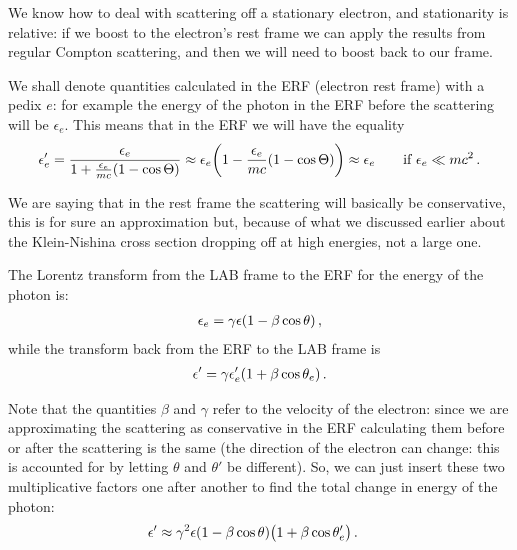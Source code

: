 \documentclass[main.tex]{subfiles}
\begin{document}
We know how to deal with scattering off a stationary electron, and stationarity is relative: if we boost to the electron's rest frame we can apply the results from regular Compton scattering, and then we will need to boost back to our frame. 

We shall denote quantities calculated in the ERF (electron rest frame) with a pedix \(e\): for example the energy of the photon in the ERF before the scattering will be \(\epsilon_e\).
This means that in the ERF we will have the equality 
%
\begin{align}
\epsilon_e' 
= \frac{\epsilon_e}{1 + \frac{\epsilon_e}{mc} (1 - \cos \Theta )} 
\approx \epsilon_e \qty(1 - \frac{\epsilon_e}{mc} (1 - \cos \Theta )) 
\approx \epsilon_e 
\qquad \text{if } \epsilon_e \ll m c^2 
\,.
\end{align}

We are saying that in the rest frame the scattering will basically be conservative, this is for sure an approximation but, because of what we discussed earlier about the Klein-Nishina cross section dropping off at high energies, not a large one. 

The Lorentz transform from the LAB frame to the ERF for the energy of the photon is: 
%
\begin{align}
\epsilon_e = \gamma \epsilon \qty(1 - \beta \cos \theta )
\,,
\end{align}
%
while the transform back from  the ERF to the LAB frame is 
%
\begin{align}
\epsilon' = \gamma \epsilon_e' \qty(1 + \beta \cos \theta _e )
\,.
\end{align}

Note that the quantities \(\beta \) and \(\gamma \) refer to the velocity of the electron: since we are approximating the scattering as conservative in the ERF calculating them before or after the scattering is the same (the direction of the electron can change: this is accounted for by letting \(\theta\) and \(\theta '\) be different). 
So, we can just insert these two multiplicative factors one after another to find the total change in energy of the photon: 
%
\begin{align}
\epsilon ' &\approx \gamma^2 \epsilon \qty(1 - \beta \cos \theta ) \qty(1 + \beta \cos \theta'_e ) 
\,.
\end{align}

\end{document}
